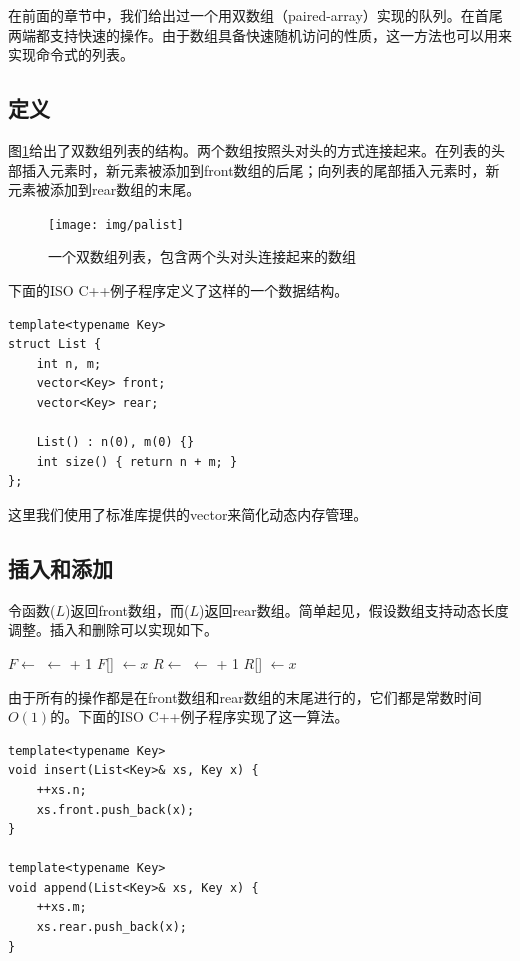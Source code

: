 \documentclass[b5paper]{ctexart}
\begin{document}
在前面的章节中，我们给出过一个用双数组（paired-array）实现的队列。在首尾两端都支持快速的操作。由于数组具备快速随机访问的性质，这一方法也可以用来实现命令式的列表。

\subsection{定义}

图\ref{fig:palist}给出了双数组列表的结构。两个数组按照头对头的方式连接起来。在列表的头部插入元素时，新元素被添加到front数组的后尾；向列表的尾部插入元素时，新元素被添加到rear数组的末尾。

\begin{figure}[htbp]
  \centering
  \texttt{[image: img/palist]}
  \caption{一个双数组列表，包含两个头对头连接起来的数组} \label{fig:palist}
\end{figure}

下面的ISO C++例子程序定义了这样的一个数据结构。

\lstset{language=C++}
\begin{lstlisting}
template<typename Key>
struct List {
    int n, m;
    vector<Key> front;
    vector<Key> rear;

    List() : n(0), m(0) {}
    int size() { return n + m; }
};
\end{lstlisting}

这里我们使用了标准库提供的vector来简化动态内存管理。

\subsection{插入和添加}
令函数($L$)返回front数组，而($L$)返回rear数组。简单起见，假设数组支持动态长度调整。插入和删除可以实现如下。

\begin{algorithmic}
  \State $F \gets $ 
  \State {} $\gets $  + 1
  \State $F$[] $\gets x$
\EndFunction
\Statex
{}
  \State $R \gets $ 
  \State {} $\gets $  + 1
  \State $R$[] $\gets x$
\EndFunction
\end{algorithmic}

由于所有的操作都是在front数组和rear数组的末尾进行的，它们都是常数时间$O(1)$的。下面的ISO C++例子程序实现了这一算法。

\begin{lstlisting}
template<typename Key>
void insert(List<Key>& xs, Key x) {
    ++xs.n;
    xs.front.push_back(x);
}

template<typename Key>
void append(List<Key>& xs, Key x) {
    ++xs.m;
    xs.rear.push_back(x);
}
\end{lstlisting}
\end{document}
